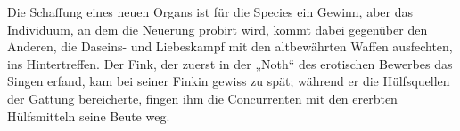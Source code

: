 Die Schaffung eines neuen Organs ist für die Species ein Gewinn, aber das Individuum, an dem die Neuerung probirt wird, kommt dabei gegenüber den Anderen, die Daseins- und Liebeskampf mit den altbewährten Waffen ausfechten, ins Hintertreffen. Der Fink, der zuerst in der „Noth“ des erotischen Bewerbes das Singen erfand, kam bei seiner Finkin gewiss zu spät; während er die Hülfsquellen der Gattung bereicherte, fingen ihm die Concurrenten mit den ererbten Hülfsmitteln seine Beute weg.
\par

